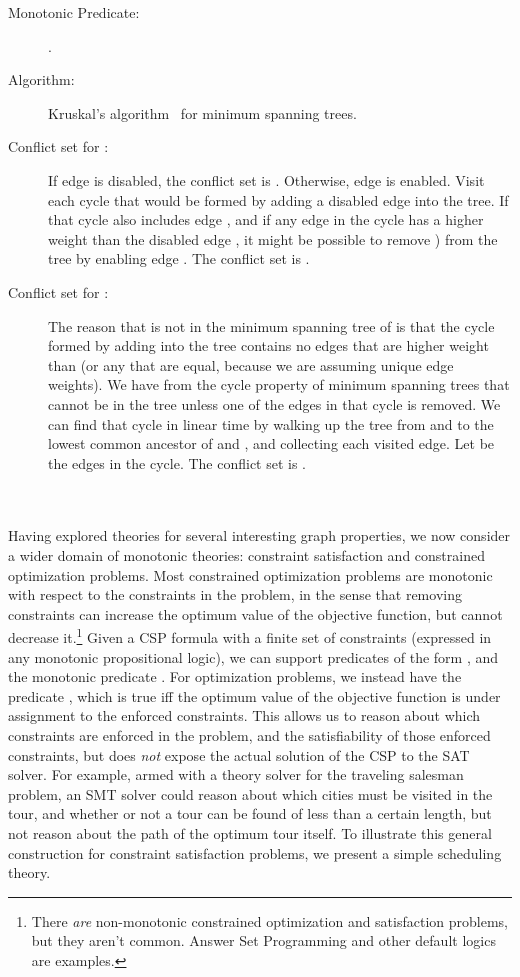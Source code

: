 \documentclass[runningheads]{llncs}
\begin{document}
\begin{description}
\item[Monotonic Predicate:] .
\item[Algorithm:] Kruskal's algorithm~\cite{kruskal1956shortest} for minimum spanning trees.
\item[Conflict set for :] If edge  is disabled, the conflict set is . 
Otherwise, edge  is enabled. Visit each cycle that would be formed by adding a disabled edge  into the tree. If that cycle also includes edge , and if any edge in the cycle has a higher weight than the disabled edge , it might be possible to remove ) from the tree by enabling edge . The conflict set is .

\item[Conflict set for :] The reason that  is not in the minimum spanning tree of  is that the cycle formed by adding  into the tree contains no edges that are higher weight than  (or any that are equal, because we are assuming unique edge weights). We have from the cycle property of minimum spanning trees that  cannot be in the tree unless one of the edges in that cycle is removed. We can find that cycle in linear time by walking up the tree from  and  to the lowest common ancestor of  and , and collecting each visited edge. Let  be the edges in the cycle. The conflict set is  .
\end{description}
 

~\\
~\\
Having explored theories for several interesting graph properties, we now
consider a wider domain of monotonic theories: constraint satisfaction
and constrained optimization problems. Most constrained optimization
problems are monotonic with respect to the constraints in the problem, in
the sense that removing constraints can increase the optimum value of the
objective function, but cannot decrease it.\footnote{There \textit{are}
non-monotonic constrained optimization and satisfaction problems, but
they aren't common. Answer Set Programming and other default logics are
examples.}  Given a CSP formula  with a finite set of constraints
 (expressed in any monotonic propositional logic), we can support
predicates of the form , and the monotonic
predicate . For optimization problems, we instead have
the predicate , which is true iff the optimum
value of the objective function is   under assignment to the enforced constraints.
This allows us to reason about which constraints are enforced in the
problem, and the satisfiability of those enforced constraints, but does
\textit{not} expose the actual solution of the CSP to the SAT solver.
For example, armed with a theory solver for the traveling salesman problem,
an SMT solver could reason about which cities must be visited in the tour,
and whether or not a tour can be found of less than a certain length,
but not reason about the path of the optimum tour itself. To illustrate this general construction for constraint
satisfaction problems, we present a simple scheduling theory.
\end{document}
